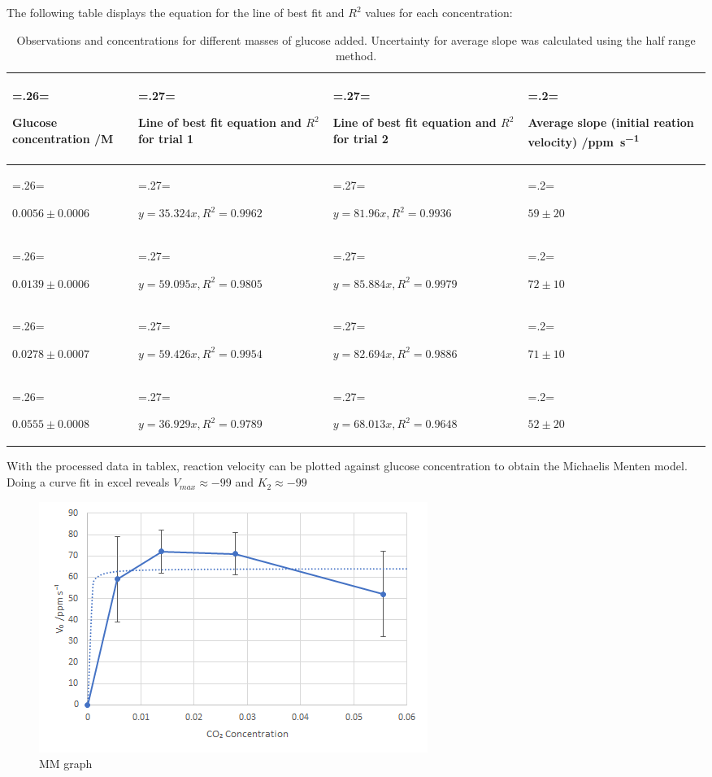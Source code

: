 \documentclass{article}
\begin{document}
The following table displays the equation for the line of best fit and $R^2$ values for each concentration:
\begin{table}[H]
\centering
\caption{Observations and concentrations for different masses of glucose added. Uncertainty for average slope was calculated using the half range method.}
\label{table:4}
\begin{tabularx}{\textwidth} {
    | >{\hsize=.26\hsize \linewidth=\hsize \raggedright\arraybackslash}X
    | >{\hsize=.27\hsize \linewidth=\hsize \raggedright\arraybackslash}X
    | >{\hsize=.27\hsize \linewidth=\hsize \raggedright\arraybackslash}X
    | >{\hsize=.2\hsize \linewidth=\hsize \raggedright\arraybackslash}X |}
    \hline
    \rowcolor[HTML]{CCCCCC} Glucose concentration /\si{M} & Line of best fit equation and $R^2$ for trial 1 & Line of best fit equation and $R^2$ for trial 2 & Average slope (initial reation velocity) /\si{ppm.s^{-1}} \\
    \hline
    $0.0056 \pm 0.0006$ & $y=35.324x, R^2=0.9962$ & $y=81.96x, R^2=0.9936$ & $59 \pm 20$ \\
    \hline
    $0.0139 \pm 0.0006$ & $y=59.095x, R^2=0.9805$ & $y=85.884x, R^2=0.9979$ & $72 \pm 10$ \\
    \hline
    $0.0278 \pm 0.0007$ & $y=59.426x, R^2=0.9954$ & $y=82.694x, R^2=0.9886$ & $71 \pm 10$ \\
    \hline
    $0.0555 \pm 0.0008$ & $y=36.929x, R^2=0.9789$ & $y=68.013x, R^2=0.9648$ & $52 \pm 20$ \\
    \hline
\end{tabularx}
\end{table}

With the processed data in tablex, reaction velocity can be plotted against glucose concentration to obtain the Michaelis Menten model. Doing a curve fit in excel reveals $V_{max} \approx -99$ and $K_2 \approx -99$
\begin{figure}[H]
    \renewcommand{\figurename}{Graph}
    \centering
    \includegraphics{figures/graph_03.png}
    \vspace*{-12pt}
    \caption{MM graph}
    \label{fig:graph3}
    \renewcommand{\figurename}{Figure}
\end{figure}
\end{document}
